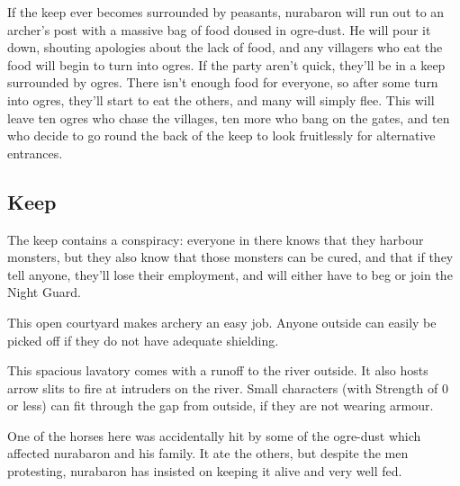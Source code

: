 \begin{multicols}{2}
If the keep ever becomes surrounded by peasants, \gls{nurabaron} will run out to an archer's post with a massive bag of food doused in ogre-dust.
He will pour it down, shouting apologies about the lack of food, and any villagers who eat the food will begin to turn into ogres.
If the party aren't quick, they'll be in a keep surrounded by ogres.
There isn't enough food for everyone, so after some turn into ogres, they'll start to eat the others, and many will simply flee.
This will leave ten ogres who chase the villages, ten more who bang on the gates, and ten who decide to go round the back of the keep to look fruitlessly for alternative entrances.

\subsection*{ Keep}

\begin{figure*}[t]



\end{figure*}
\label{redfall_keep_map}
\setcounter{list}{0}

The keep contains a conspiracy: everyone in there knows that they harbour monsters, but they also know that those monsters can be cured, and that if they tell anyone, they'll lose their employment, and will either have to beg or join the Night Guard.



This open courtyard makes archery an easy job.  Anyone outside can easily be picked off if they do not have adequate shielding.


This spacious lavatory comes with a runoff to the river outside.
It also hosts arrow slits to fire at intruders on the river.
Small characters (with Strength of 0 or less) can fit through the gap from outside, if they are not wearing armour.


One of the horses here was accidentally hit by some of the ogre-dust which affected \gls{nurabaron} and his family.  It ate the others, but despite the men protesting, \gls{nurabaron} has insisted on keeping it alive and very well fed.



\end{multicols}
